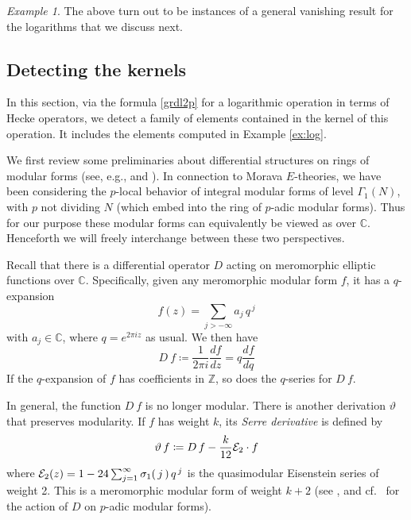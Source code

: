 \documentclass{gtpart}
\theoremstyle{definition}
\theoremstyle{remark}
\newtheorem{ex}[equation]{Example}
\newcommand{\mb}[1]{\mathbb{#1}}
\newcommand{\CE}{{\cal E}}
\newcommand{\BC}{{\mb C}}
\newcommand{\BZ}{{\mb Z}}
\newcommand{\G}{\Gamma}
\newcommand{\si}{\sigma}
\newcommand{\ce}{\coloneqq}
\renewcommand{\=}{\approx}
\renewcommand{\-}{\sim}
\numberwithin{equation}{section}
\begin{document}
\begin{ex}
 The above turn out to be instances of a general vanishing result for the 
 logarithms that we discuss next.  
\end{ex}



\subsection{Detecting the kernels}
\label{subsec:thm}

In this section, via the formula \eqref{grdl2p} for a logarithmic operation in 
terms of Hecke operators, we detect a family of elements contained in the kernel 
of this operation.  It includes the elements computed in Example \ref{ex:log}.  

We first review some preliminaries about differential structures on rings of 
modular forms (see, e.g., \cite[\S 5]{1-2-3} and \cite[Section 2.3]{web}).  In 
connection to Morava $E$-theories, we have been considering the $p$-local 
behavior of integral modular forms of level $\G_1(N)$, with $p$ not dividing $N$ 
(which embed into the ring of $p$-adic modular forms).  Thus for our purpose 
these modular forms can equivalently be viewed as over $\BC$.  Henceforth we 
will freely interchange between these two perspectives.  

Recall that there is a differential operator $D$ acting on meromorphic elliptic 
functions over $\BC$.  Specifically, given any meromorphic modular form $f$, it 
has a $q$-expansion 
\[
 f(z) = \sum_{j > -\infty} a_j \, q^{\,j} 
\]
with $a_j \in \BC$, where $q = e^{2 \pi i z}$ as usual.  We then have 
\begin{equation}
 \label{ramanujan}
 D ~\! f \ce \frac{1}{2 \pi i} \frac{df}{dz} = q \frac{df}{dq} 
\end{equation}
If the $q$-expansion of $f$ has coefficients in $\BZ$, so does the $q$-series 
for $D ~\! f$.  

In general, the function $D ~\! f$ is no longer modular.  There is another 
derivation $\vartheta$ that preserves modularity.  If $f$ has weight $k$, its 
{\em Serre derivative} is defined by 
\begin{equation}
 \label{serre}
 \vartheta ~\! f \ce D ~\! f - \frac{k}{12} \CE_2 \cdot f 
\end{equation}
where $\CE_2(z) = 1 - 24 \sum_{j = 1}^\infty \si_1(\,j\,) \, q^{\,j}$ is the 
quasimodular Eisenstein series of weight 2.  This is a meromorphic modular form 
of weight $k + 2$ (see \cite[Proposition 2.11]{web}, and 
cf.~\cite[Th\'eor\`eme 5(a)]{fmpadiq} for the action of $D$ on $p$-adic modular 
forms).  
\end{document}
